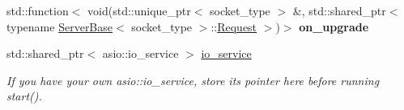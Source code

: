 \begin{DoxyCompactItemize}
\item 
std\+::function$<$ void(std\+::unique\+\_\+ptr$<$ socket\+\_\+type $>$ \&, std\+::shared\+\_\+ptr$<$ typename \hyperlink{classSimpleWeb_1_1ServerBase}{Server\+Base}$<$ socket\+\_\+type $>$\+::\hyperlink{classSimpleWeb_1_1ServerBase_1_1Request}{Request} $>$)$>$ {\bfseries on\+\_\+upgrade}\hypertarget{classSimpleWeb_1_1ServerBase_a6a969c7fb80a9ac1975991c760792516}{}\label{classSimpleWeb_1_1ServerBase_a6a969c7fb80a9ac1975991c760792516}

\item 
std\+::shared\+\_\+ptr$<$ asio\+::io\+\_\+service $>$ \hyperlink{classSimpleWeb_1_1ServerBase_a215ecd56e2772085a1447337293abc48}{io\+\_\+service}\hypertarget{classSimpleWeb_1_1ServerBase_a215ecd56e2772085a1447337293abc48}{}\label{classSimpleWeb_1_1ServerBase_a215ecd56e2772085a1447337293abc48}

\begin{DoxyCompactList}\small\item\em If you have your own asio\+::io\+\_\+service, store its pointer here before running start(). \end{DoxyCompactList}\end{DoxyCompactItemize}

